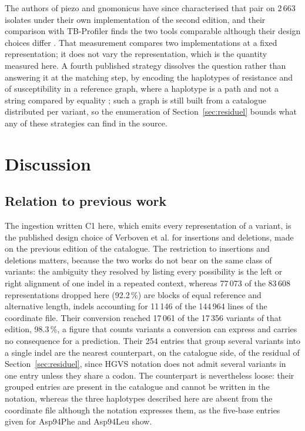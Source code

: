 \documentclass[11pt]{article}
\begin{document}
The authors of piezo and gnomonicus have since characterised that pair on 2\,663 isolates
under their own implementation of the second edition, and their comparison with TB-Profiler
finds the two tools comparable although their design choices differ \cite{westhead2025}. That
measurement compares two implementations at a fixed representation; it does not vary the
representation, which is the quantity measured here. A fourth published strategy dissolves the
question rather than answering it at the matching step, by encoding the haplotypes of
resistance and of susceptibility in a reference graph, where a haplotype is a path and not a
string compared by equality \cite{drprg2023}; such a graph is still built from a catalogue
distributed per variant, so the enumeration of Section~\ref{sec:residuel} bounds what any of
these strategies can find in the source.

\section{Discussion}

\subsection{Relation to previous work}\label{sec:anterieur}
The ingestion written C1 here, which emits every representation of a variant, is the
published design choice of Verboven et al. \cite{verboven2022} for insertions and
deletions, made on the previous edition of the catalogue. The restriction to insertions and
deletions matters, because the two works do not bear on the same class of variants: the
ambiguity they resolved by listing every possibility is the left or right alignment of one
indel in a repeated context, whereas 77\,073 of the 83\,608 representations dropped here
(92.2\,\%) are blocks of equal reference and alternative length, indels accounting for
11\,146 of the 144\,964 lines of the coordinate file. Their conversion reached 17\,061 of the
17\,356 variants of that edition, 98.3\,\%, a figure that counts variants a conversion can
express and carries no consequence for a prediction. Their 254 entries that group several
variants into a single indel are the nearest counterpart, on the catalogue side, of the
residual of Section~\ref{sec:residuel}, since HGVS notation does not admit several variants in
one entry unless they share a codon. The counterpart is nevertheless loose: their grouped
entries are present in the catalogue and cannot be written in the notation, whereas the three
haplotypes described here are absent
from the coordinate file although the notation expresses them, as the five-base entries given
for Asp94Phe and Asp94Leu show.
\end{document}
